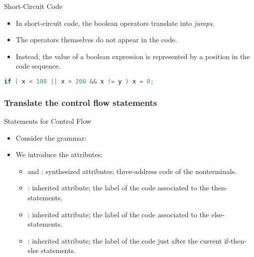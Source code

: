 \begin{bibunit}[apalike]
\begin{frame}[fragile]{Short-Circuit Code}
	\begin{itemize}
	\item In short-circuit code, the boolean operators translate into \emph{jumps}.
	\item The operators themselves do not appear in the code.
	\item Instead, the value of a boolean expression is represented by a position in the code sequence.
	\end{itemize}
	\begin{example}
		\begin{lstlisting}[linewidth=.6\linewidth,language=Java]
		if ( x < 100 || x > 200 && x != y ) x = 0;
		\end{lstlisting}
		\begin{tac}[.6\linewidth]
		\tacdots[L2]
		\end{tac}
	\end{example}
\end{frame}

\subsubsection{Translate the control flow statements}

\tableofcontentslide[sections={3-},sectionstyle={show/shaded},subsectionstyle={show/shaded/hide},subsubsectionstyle={show/shaded/hide/hide}]

\begin{frame}{Statements for Control Flow}
	\begin{itemize}
	\item Consider the grammar:
	\vfill
	\item We introduce the attributes:
		\begin{itemize}
		\item {} and : synthesized attributes; three-address code of the nonterminals.
		\item {}: inherited attribute; the label of the code associated to the then-statements.
		\item {}: inherited attribute; the label of the code associated to the else-statements.
		\item {}: inherited attribute; the label of the code just after the current if-then-else statements.
		\end{itemize}
	\end{itemize}
\end{frame}


\end{bibunit}
